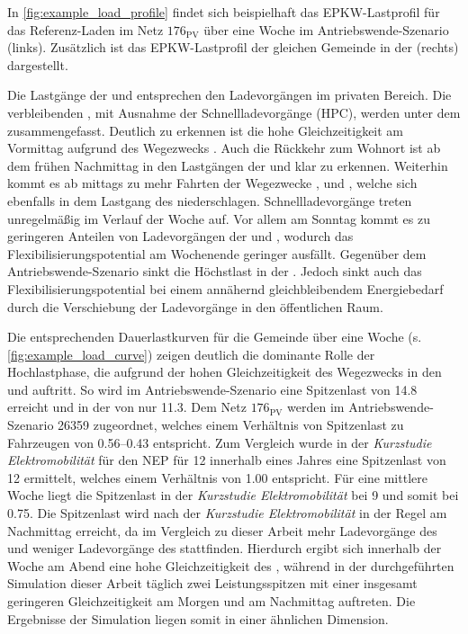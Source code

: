 

In \autoref{fig:example_load_profile} findet sich beispielhaft das \gls{EPKW}-Lastprofil für das Referenz-Laden im Netz \(176_{\text{PV}}\) über eine Woche im Antriebswende-Szenario (links).
Zusätzlich ist das \gls{EPKW}-Lastprofil der gleichen Gemeinde in der \SzeFirmenparkplatz (rechts) dargestellt.



Die Lastgänge der \UCs \zH und \Firmeparkplatz entsprechen den Ladevorgängen im privaten Bereich.
Die verbleibenden \UCsdot, mit Ausnahme der Schnellladevorgänge (\gls{HPC}), werden unter dem \UC \oeffen zusammengefasst.
Deutlich zu erkennen ist die hohe Gleichzeitigkeit am Vormittag aufgrund des Wegezwecks \Arbeitdot.
Auch die Rückkehr zum Wohnort ist ab dem frühen Nachmittag in den Lastgängen der \UCs \zH und \oeffen klar zu erkennen.
Weiterhin kommt es ab mittags zu mehr Fahrten der Wegezwecke \Einkaufdot, \Erledigung und \Freizeitdot, welche sich ebenfalls in dem Lastgang des \UC \oeffen niederschlagen.
Schnellladevorgänge treten unregelmäßig im Verlauf der Woche auf.
Vor allem am Sonntag kommt es zu geringeren Anteilen von Ladevorgängen der \UCs \zH und \Firmeparkplatzdot, wodurch das Flexibilisierungspotential am Wochenende geringer ausfällt.
Gegenüber dem Antriebswende-Szenario sinkt die Höchstlast in der \SzeFirmenparkplatzdot.
Jedoch sinkt auch das Flexibilisierungspotential bei einem annähernd gleichbleibendem Energiebedarf durch die Verschiebung der Ladevorgänge in den öffentlichen Raum.\medskip

Die entsprechenden Dauerlastkurven für die Gemeinde über eine Woche (s. \autoref{fig:example_load_curve}) zeigen deutlich die dominante Rolle der Hochlastphase, die aufgrund der hohen Gleichzeitigkeit des Wegezwecks \Arbeit in den \UCs \Firmeparkplatz und \Straszenrand auftritt.
So wird im Antriebswende-Szenario eine Spitzenlast von \SI{14.8}{\mw} erreicht und in der \SzeFirmenparkplatz von nur \SI{11.3}{\mw}.
Dem Netz \(176_{\text{PV}}\) werden im Antriebswende-Szenario \SI{26359}{\FZ} zugeordnet, welches einem Verhältnis von Spitzenlast zu Fahrzeugen von \SIrange[range-phrase=~bzw.~]{0.56}{0.43}{\kWperFZ} entspricht.
Zum Vergleich wurde in der \textit{Kurzstudie Elektromobilität} für den \gls{NEP} \cite{Ebner2019} für \SI{12}{\MioStk} innerhalb eines Jahres eine Spitzenlast von \SI{12}{\gw} ermittelt, welches einem Verhältnis von \SI{1.00}{\kWperFZ} entspricht.
Für eine mittlere Woche liegt die Spitzenlast in der \textit{Kurzstudie Elektromobilität} bei \SI{9}{\gw} und somit bei \SI{0.75}{\kWperFZ}.
Die Spitzenlast wird nach der \textit{Kurzstudie Elektromobilität} in der Regel am Nachmittag erreicht, da im Vergleich zu dieser Arbeit mehr Ladevorgänge des \UC \zH und weniger Ladevorgänge des \UC \Firmeparkplatz stattfinden.
Hierdurch ergibt sich innerhalb der Woche am Abend eine hohe Gleichzeitigkeit des \UC \zHdot, während in der durchgeführten Simulation dieser Arbeit täglich zwei Leistungsspitzen mit einer insgesamt geringeren Gleichzeitigkeit am Morgen und am Nachmittag auftreten.
Die Ergebnisse der Simulation liegen somit in einer ähnlichen Dimension.

